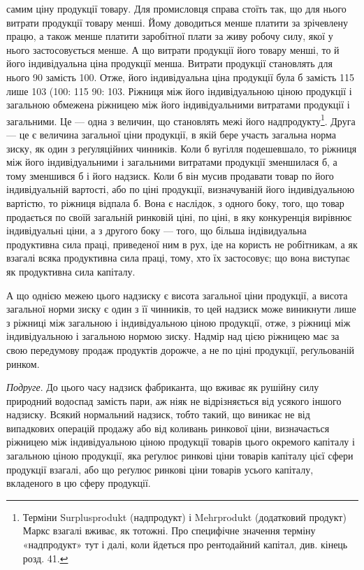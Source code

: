 \parcont{}  %
самим ціну продукції товару. Для промисловця справа стоїть так, що для нього
витрати продукції товару менші. Йому доводиться менше платити за зрічевлену
працю, а також менше платити заробітної плати за живу робочу силу, якої
у нього застосовується менше. А що витрати продукції його товару менші,
то й його індивідуальна ціна продукції менша. Витрати продукції становлять для
нього 90 замість 100. Отже, його індивідуальна ціна продукції була б замість
115 лише 103 (100: 115 \deq{} 90: 103. Ріжниця між його індивідуальною ціною
продукції і загальною обмежена ріжницею між його індивідуальними витратами
продукції і загальними. Це — одна з величин, що становлять межі його надпродукту\footnote{Терміни Surplusprodukt (надпродукт) і Mehrprodukt (додатковий продукт) Маркс взагалі вживає,
як тотожні. Про специфічне значення терміну «надпродукт» тут і далі, коли йдеться
про рентодайний капітал, див. кінець розд. 41. }. Друга — це є величина загальної ціни продукції, в якій бере участь
загальна норма зиску, як один з реґуляційних чинників. Коли б вугілля подешевшало,
то ріжниця між його індивідуальними і загальними витратами продукції
зменшилася б, а тому зменшився б і його надзиск. Коли б він мусив продавати
товар по його індивідуальній вартості, або по ціні продукції, визначуваній
його індивідуальною вартістю, то ріжниця відпала б. Вона є наслідок, з одного
боку, того, що товар продається по своїй загальній ринковій ціні, по ціні,
в яку конкуренція вирівнює індивідуальні ціни, а з другого боку — того, що
більша індівидуальна продуктивна сила праці, приведеної ним в рух, іде на користь
не робітникам, а як взагалі всяка продуктивна сила праці, тому, хто їх
застосовує; що вона виступає як продуктивна сила капіталу.

А що однією межею цього надзиску є висота загальної ціни продукції,
а висота загальної норми зиску є один з її чинників, то цей надзиск може
виникнути лише з ріжниці між загальною і індивідуальною ціною продукції,
отже, з ріжниці між індивідуальною і загальною нормою зиску. Надмір над цією
ріжницею має за свою передумову продаж продуктів дорожче, а не по ціні
продукції, реґульованій ринком.

\emph{Подруге}. До цього часу надзиск фабриканта, що вживає як рушійну силу
природний водоспад замість пари, аж ніяк не відрізняється від усякого іншого
надзиску. Всякий нормальний надзиск, тобто такий, що виникає не від випадкових
операцій продажу або від коливань ринкової ціни, визначається ріжницею між
індивідуальною ціною продукції товарів цього окремого капіталу і загальною
ціною продукції, яка реґулює ринкові ціни товарів капіталу цієї сфери продукції
взагалі, або що реґулює ринкові ціни товарів усього капіталу, вкладеного в цю
сферу продукції.

